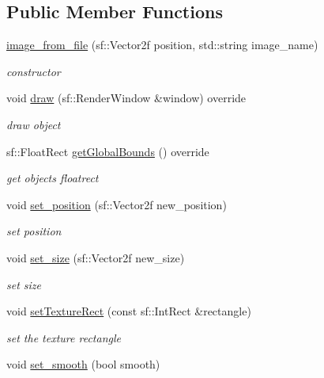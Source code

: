 \subsection*{Public Member Functions}
\begin{DoxyCompactItemize}
\item 
\hyperlink{classimage__from__file_a08fd7ad55a2eb520242e31ff3cdf2663}{image\+\_\+from\+\_\+file} (sf\+::\+Vector2f position, std\+::string image\+\_\+name)
\begin{DoxyCompactList}\small\item\em constructor \end{DoxyCompactList}\item 
void \hyperlink{classimage__from__file_a26eae6c872ca9033cacc3f6eb2762983}{draw} (sf\+::\+Render\+Window \&window) override
\begin{DoxyCompactList}\small\item\em draw object \end{DoxyCompactList}\item 
sf\+::\+Float\+Rect \hyperlink{classimage__from__file_a971a591f906fa5c6e85b4e32cfc3d6a0}{get\+Global\+Bounds} () override
\begin{DoxyCompactList}\small\item\em get objects floatrect \end{DoxyCompactList}\item 
void \hyperlink{classimage__from__file_a868911f8d541af91290fb8dc56435cd2}{set\+\_\+position} (sf\+::\+Vector2f new\+\_\+position)
\begin{DoxyCompactList}\small\item\em set position \end{DoxyCompactList}\item 
void \hyperlink{classimage__from__file_a43b0d6b11bf46827308e4e6cb7aa8579}{set\+\_\+size} (sf\+::\+Vector2f new\+\_\+size)
\begin{DoxyCompactList}\small\item\em set size \end{DoxyCompactList}\item 
void \hyperlink{classimage__from__file_a6561a7e8833e4ca84ba5a31e98802757}{set\+Texture\+Rect} (const sf\+::\+Int\+Rect \&rectangle)
\begin{DoxyCompactList}\small\item\em set the texture rectangle \end{DoxyCompactList}\item 
void \hyperlink{classimage__from__file_a2d808924e71e3eaf18532d9b32e40f07}{set\+\_\+smooth} (bool smooth)

\end{DoxyCompactItemize}
